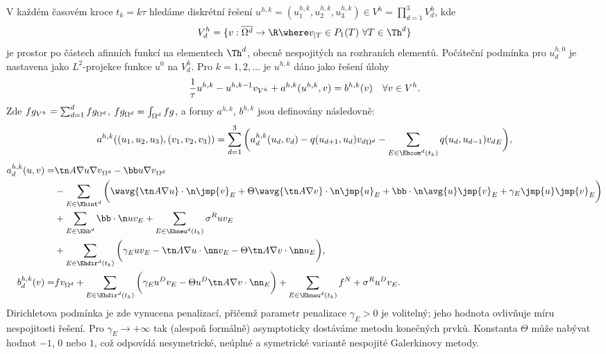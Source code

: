 V každém časovém kroce $t_k=k\tau$ hledáme diskrétní řešení $u^{h,k}=(u_1^{h,k},u_2^{h,k},u_3^{h,k})\in V^h=\prod_{d=1}^3 V_d^h$, kde
$$ V_d^h = \{v:\overline{\Omega^d}\to\R\where v_{|T}\in P_1(T)~\forall T\in\Th^d\} $$
je prostor po částech afinních funkcí na elementech $\Th^d$, obecně nespojitých na rozhraních elementů.
Počáteční podmínka pro $u_d^{h,0}$ je nastavena jako $L^2$-projekce funkce $u^0$ na $V_d^h$.
Pro $k=1,2,\ldots$ je $u^{h,k}$ dáno jako řešení úlohy
\begin{equation*}
\frac1\tau\sc{u^{h,k}-u^{h,k-1}}{v}_{V^h} + a^{h,k}(u^{h,k},v) = b^{h,k}(v) \quad \forall v\in V^h.
\end{equation*}
Zde $\sc{f}{g}_{V^h}=\sum_{d=1}^d\sc{f}{g}_{\Omega^d}$, $\sc{f}{g}_{\Omega^d}=\int_{\Omega^d} f g$, a formy $a^{h,k}$, $b^{h,k}$ jsou definovány následovně:
\[
a^{h,k}((u_1,u_2,u_3),(v_1,v_2,v_3)) = \sum_{d=1}^3\bigg( a^{h,k}_d(u_d,v_d) - \sc{q(u_{d+1},u_d)}{v_d}_{\Omega^d}
- \sum_{E\in\Ehcom^d(t_k)}\sc{q(u_d,u_{d-1})}{v_d}_E \bigg),
\]
\begin{align*}
a^{h,k}_d(u,v) = &\sc{\tn A\nabla u}{\nabla v}_{\Omega^d}
- \sc{\bb u}{\nabla v}_{\Omega^d}\\
&- \sum_{E\in\Ehint^d}\bigg(\sc{\wavg{\tn A\nabla u}\cdot\n}{\jmp{v}}_E + \Theta\sc{\wavg{\tn A\nabla v}\cdot\n}{\jmp{u}}_E
+ \sc{\bb\cdot\n\avg{u}}{\jmp{v}}_E
+ \gamma_E\sc{\jmp{u}}{\jmp{v}}_E\bigg)\\
&+ \sum_{E\in\Ehb^d}\sc{\bb\cdot\n u}{v}_E
+ \sum_{E\in\Ehneu^d(t_k)}\sc{\sigma^R u}{v}_E\\
&+ \sum_{E\in\Ehdir^d(t_k)}\bigg(\gamma_E\sc{u}{v}_E - \sc{\tn A\nabla u\cdot\nn}{v}_E - \Theta\sc{\tn A\nabla v\cdot\nn}{u}_E\bigg),\\
% 
b^{h,k}_d(v) = &\sc{f}{v}_{\Omega^d} + \sum_{E\in\Ehdir^d(t_k)}\bigg(\gamma_E\sc{u^D}{v}_E - \Theta\sc{u^D}{\tn A\nabla v\cdot\nn}_E\bigg)
+ \sum_{E\in\Ehneu^d(t_k)}\sc{f^N+\sigma^R u^D}{v}_E.
\end{align*}
Dirichletova podmínka je zde vynucena penalizací, přičemž parametr penalizace $\gamma_E>0$ je volitelný; jeho hodnota ovlivňuje míru nespojitosti řešení. Pro $\gamma_E\to+\infty$ tak (alespoň formálně) asymptoticky dostáváme metodu konečných prvků.
Konstanta $\Theta$ může nabývat hodnot $-1$, $0$ nebo $1$, což odpovídá nesymetrické, neúplné a symetrické variantě nespojité Galerkinovy metody.

